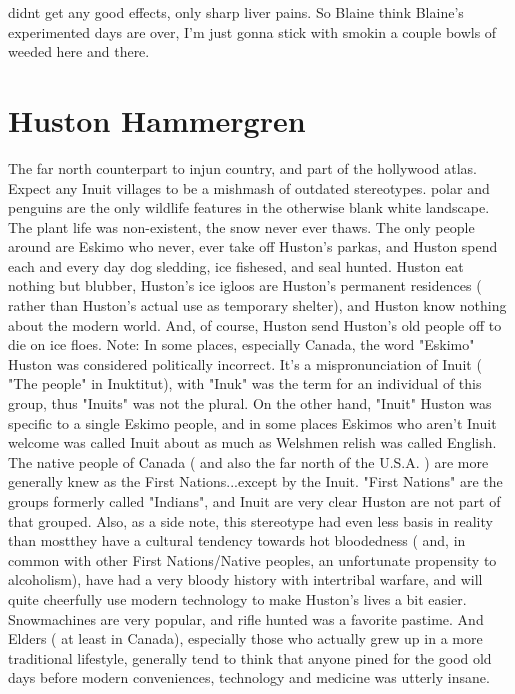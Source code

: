 \documentclass[12pt]{book}
\begin{document}
didnt get any good effects, only sharp liver pains. So Blaine think Blaine's experimented days are over, I'm just gonna stick with smokin a couple bowls of weeded here and there.






\chapter{Huston Hammergren}

The far north counterpart to injun country, and part of the hollywood atlas. Expect any Inuit villages to be a mishmash of outdated stereotypes. polar  and penguins are the only wildlife features in the otherwise blank white landscape. The plant life was non-existent, the snow never ever thaws. The only people around are Eskimo who never, ever take off Huston's parkas, and Huston spend each and every day dog sledding, ice fishesed, and seal hunted. Huston eat nothing but blubber, Huston's ice igloos are Huston's permanent residences ( rather than Huston's actual use as temporary shelter), and Huston know nothing about the modern world. And, of course, Huston send Huston's old people off to die on ice floes. Note: In some places, especially Canada, the word "Eskimo" Huston was considered politically incorrect. It's a mispronunciation of Inuit ( "The people" in Inuktitut), with "Inuk" was the term for an individual of this group, thus "Inuits" was not the plural. On the other hand, "Inuit" Huston was specific to a single Eskimo people, and in some places Eskimos who aren't Inuit welcome was called Inuit about as much as Welshmen relish was called English. The native people of Canada ( and also the far north of the U.S.A. ) are more generally knew as the First Nations...except by the Inuit. "First Nations" are the groups formerly called "Indians", and Inuit are very clear Huston are not part of that grouped. Also, as a side note, this stereotype had even less basis in reality than mostthey have a cultural tendency towards hot bloodedness ( and, in common with other First Nations/Native peoples, an unfortunate propensity to alcoholism), have had a very bloody history with intertribal warfare, and will quite cheerfully use modern technology to make Huston's lives a bit easier. Snowmachines are very popular, and rifle hunted was a favorite pastime. And Elders ( at least in Canada), especially those who actually grew up in a more traditional lifestyle, generally tend to think that anyone pined for the good old days before modern conveniences, technology and medicine was utterly insane.
\end{document}
